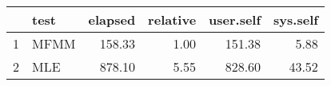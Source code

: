 \begin{table}[ht]
\centering
\begin{tabular}{rlrrrr}
  \hline
 & test & elapsed & relative & user.self & sys.self \\ 
  \hline
1 & MFMM & 158.33 & 1.00 & 151.38 & 5.88 \\ 
  2 & MLE & 878.10 & 5.55 & 828.60 & 43.52 \\ 
   \hline
\end{tabular}
\end{table}

